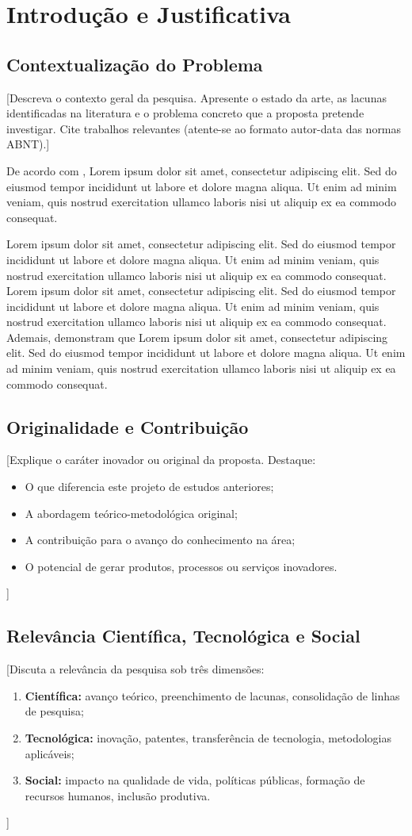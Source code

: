 \documentclass[
  12pt,
  a4paper,
  oneside,
  english,      %
  brazil
]{article}
\newcommand{\lorem}{%
  Lorem ipsum dolor sit amet, consectetur adipiscing elit.
  Sed do eiusmod tempor incididunt ut labore et dolore magna aliqua.
  Ut enim ad minim veniam, quis nostrud exercitation ullamco laboris
  nisi ut aliquip ex ea commodo consequat.}
\begin{document}
\newpage
\section{Introdução e Justificativa}

\subsection{Contextualização do Problema}

[Descreva o contexto geral da pesquisa. Apresente o estado da arte,
as lacunas identificadas na literatura e o problema concreto que a
proposta pretende investigar. Cite trabalhos relevantes (atente-se
ao formato autor-data das normas ABNT).]

De acordo com \cite{autor2023}, \lorem{}

\lorem{} \lorem{} Ademais,  demonstram que
\lorem{}

\subsection{Originalidade e Contribuição}

[Explique o caráter inovador ou original da proposta. Destaque:
\begin{itemize}
  \item O que diferencia este projeto de estudos anteriores;
  \item A abordagem teórico-metodológica original;
  \item A contribuição para o avanço do conhecimento na área;
  \item O potencial de gerar produtos, processos ou serviços inovadores.
\end{itemize}]

\subsection{Relevância Científica, Tecnológica e Social}

[Discuta a relevância da pesquisa sob três dimensões:
\begin{enumerate}[label=\textbf{\alph*)}]
  \item \textbf{Científica:} avanço teórico, preenchimento de lacunas,
        consolidação de linhas de pesquisa;
  \item \textbf{Tecnológica:} inovação, patentes, transferência de
        tecnologia, metodologias aplicáveis;
  \item \textbf{Social:} impacto na qualidade de vida, políticas
        públicas, formação de recursos humanos, inclusão produtiva.
\end{enumerate}]
\end{document}
